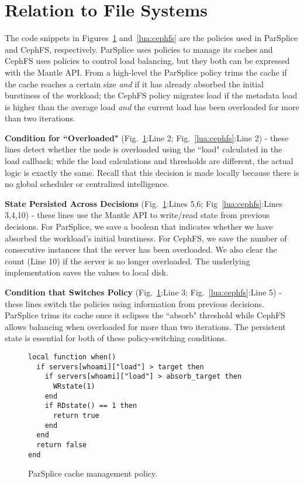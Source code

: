 \section{Relation to File Systems}
\label{sec:relation-to-file-systems}

The code snippets in Figures~\ref{lua:parsplice} and~\ref{lua:cephfs} are the
policies used in ParSplice and CephFS, respectively.  ParSplice uses policies
to manage its caches and CephFS uses policies to control load balancing, but
they both can be expressed with the Mantle API.  From a high-level the
ParSplice policy trims the cache if the cache reaches a certain size {\it and}
if it has already absorbed the initial burstiness of the workload; the CephFS
policy migrates load if the metadata load is higher than the average load {\it
and} the current load has been overloaded for more than two iterations.

\textbf{Condition for ``Overloaded"} (Fig.~\ref{lua:parsplice}:Line 2;
Fig.~\ref{lua:cephfs}:Line 2) - these lines detect whether the node is
overloaded using the ``load" calculated in the load callback; while the load
calculations and thresholds are different, the actual logic is exactly the
same.  Recall that this decision is made locally because there is no global
scheduler or centralized intelligence. 

\textbf{State Persisted Across Decisions} (Fig.~\ref{lua:parsplice}:Lines 5,6;
Fig~\ref{lua:cephfs}:Lines 3,4,10) - these lines use the Mantle API to
write/read state from previous decisions.  For ParSplice, we save a boolean
that indicates whether we have absorbed the workload's initial burstiness. For
CephFS, we save the number of consecutive instances that the server has been
overloaded. We also clear the count (Line 10) if the server is no longer
overloaded. The underlying implementation saves the values to local disk.

\textbf{Condition that Switches Policy} (Fig.~\ref{lua:parsplice}:Line 3;
Fig.~\ref{lua:cephfs}:Line 5) - these lines switch the policies using
information from previous decisions. ParSplice trims its cache once it eclipses
the ``absorb" threshold while CephFS allows balancing when overloaded for more
than two iterations. The persistent state is essential for both of these
policy-switching conditions.

\begin{figure}[tb]
\begin{verbatim}
local function when()
  if servers[whoami]["load"] > target then
    if servers[whoami]["load"] > absorb_target then
      WRstate(1)
    end
    if RDstate() == 1 then
      return true
    end
  end
  return false
end
\end{verbatim}
\caption{ParSplice cache management policy.\label{lua:parsplice}}
\end{figure}

